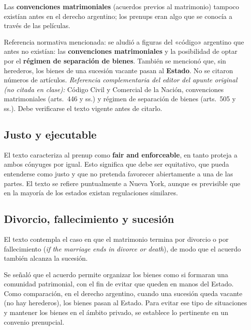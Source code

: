 \documentclass[12pt,oneside]{book}
\begin{document}
Las \textbf{convenciones matrimoniales} (acuerdos previos al matrimonio) tampoco existían antes en el derecho argentino; los prenups eran algo que se conocía a través de las películas.

\begin{note}
Referencia normativa mencionada: se aludió a figuras del «código» argentino que antes no existían: las \textbf{convenciones matrimoniales} y la posibilidad de optar por el \textbf{régimen de separación de bienes}. También se mencionó que, sin herederos, los bienes de una sucesión vacante pasan al \textbf{Estado}. No se citaron números de artículos. \textit{Referencia complementaria del editor del apunte original (no citada en clase):} Código Civil y Comercial de la Nación, convenciones matrimoniales (arts.~446 y ss.) y régimen de separación de bienes (arts.~505 y ss.). Debe verificarse el texto vigente antes de citarlo.
\end{note}

\subsection{Justo y ejecutable}

El texto caracteriza al prenup como \textbf{fair and enforceable}, en tanto proteja a ambos cónyuges por igual. Esto significa que debe ser equitativo, que pueda entenderse como justo y que no pretenda favorecer abiertamente a una de las partes. El texto se refiere puntualmente a Nueva York, aunque es previsible que en la mayoría de los estados existan regulaciones similares.

\subsection{Divorcio, fallecimiento y sucesión}

El texto contempla el caso en que el matrimonio termina por divorcio o por fallecimiento (\textit{if the marriage ends in divorce or death}), de modo que el acuerdo también alcanza la sucesión.

Se señaló que el acuerdo permite organizar los bienes como si formaran una comunidad patrimonial, con el fin de evitar que queden en manos del Estado. Como comparación, en el derecho argentino, cuando una sucesión queda vacante (no hay herederos), los bienes pasan al Estado. Para evitar ese tipo de situaciones y mantener los bienes en el ámbito privado, se establece lo pertinente en un convenio prenupcial.
\end{document}
